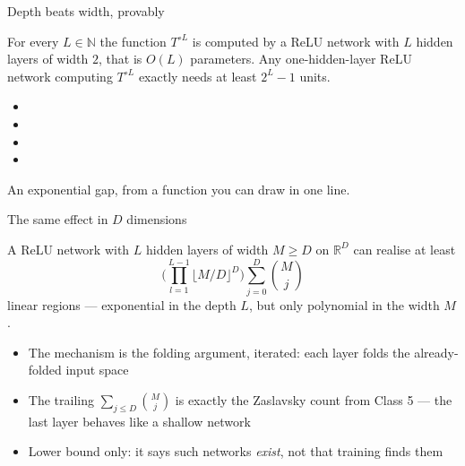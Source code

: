 \documentclass[aspectratio=169, 11pt]{beamer}
\newcommand{\src}[3]{}      %
\begin{document}
\begin{frame}{Depth beats width, provably}
  \src{telgarsky2016}{section}{1.1}
  \src{telgarsky2016}{section}{3.3}
  \begin{theorem}
    {\small For every $L\in\mathbb{N}$ the function $T^{\circ L}$ is
    computed by a ReLU network with $L$ hidden layers of width $2$,
    that is $O(L)$ parameters. Any \alert{one-hidden-layer} ReLU
    network computing $T^{\circ L}$ exactly needs at least
    $2^{L}-1$ units.}
  \end{theorem}
  \vspace{-0.2em}
  {\scriptsize
  \begin{itemize}\setlength{\itemsep}{1pt}
    \item {}
    \item {}
    \item {}
    \item {}
  \end{itemize}}
  \vspace{0.1em}
  \begin{redhighlight}
    {\footnotesize An \alert{exponential} gap, from a function you
    can draw in one line.}
  \end{redhighlight}
\end{frame}

\begin{frame}{The same effect in $D$ dimensions}
  \src{montufar2014}{section}{3.2}
  \begin{theorem}
    {\small A ReLU network with $L$ hidden layers of width
    $M\ge D$ on $\mathbb{R}^{D}$ can realise at least
    \[
      \Big(\prod_{l=1}^{L-1}\big\lfloor M/D \big\rfloor^{D}\Big)
      \sum_{j=0}^{D}\binom{M}{j}
    \]
    linear regions --- \alert{exponential in the depth $L$}, but only
    \alert{polynomial in the width $M$}.}
  \end{theorem}
  \vspace{0.1em}
  {\footnotesize
  \begin{itemize}\setlength{\itemsep}{2pt}
    \item The mechanism is the folding argument, iterated: each
          layer folds the already-folded input space
    \item The trailing $\sum_{j\le D}\binom{M}{j}$ is exactly the
          \alert{Zaslavsky count} from Class 5 --- the last layer
          behaves like a shallow network
    \item Lower bound only: it says such networks \emph{exist}, not
          that training finds them
  \end{itemize}}
\end{frame}
\end{document}
